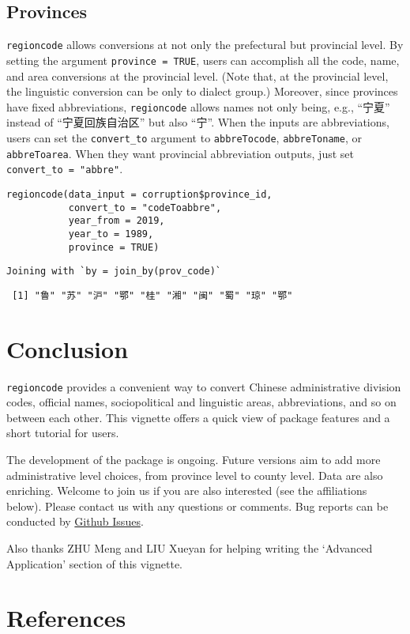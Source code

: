 \documentclass[
  article]{jss}
\begin{document}
\hypertarget{provinces}{%
\subsection{Provinces}\label{provinces}}

\texttt{regioncode} allows conversions at not only the prefectural but
provincial level. By setting the argument \texttt{province\ =\ TRUE},
users can accomplish all the code, name, and area conversions at the
provincial level. (Note that, at the provincial level, the linguistic
conversion can be only to dialect group.) Moreover, since provinces have
fixed abbreviations, \texttt{regioncode} allows names not only being,
e.g., ``宁夏'' instead of ``宁夏回族自治区'' but also ``宁''. When the
inputs are abbreviations, users can set the \texttt{convert\_to}
argument to \texttt{abbreTocode}, \texttt{abbreToname}, or
\texttt{abbreToarea}. When they want provincial abbreviation outputs,
just set \texttt{convert\_to\ =\ "abbre"}.

\begin{verbatim}
regioncode(data_input = corruption$province_id, 
           convert_to = "codeToabbre",
           year_from = 2019,
           year_to = 1989,
           province = TRUE)
\end{verbatim}

\begin{verbatim}
Joining with `by = join_by(prov_code)`
\end{verbatim}

\begin{verbatim}
 [1] "鲁" "苏" "沪" "鄂" "桂" "湘" "闽" "蜀" "琼" "鄂"
\end{verbatim}

\hypertarget{conclusion}{%
\section{Conclusion}\label{conclusion}}

\texttt{regioncode} provides a convenient way to convert Chinese
administrative division codes, official names, sociopolitical and
linguistic areas, abbreviations, and so on between each other. This
vignette offers a quick view of package features and a short tutorial
for users.

The development of the package is ongoing. Future versions aim to add
more administrative level choices, from province level to county level.
Data are also enriching. Welcome to join us if you are also interested
(see the affiliations below). Please contact us with any questions or
comments. Bug reports can be conducted by
\href{https://github.com/sammo3182/regioncode/issues}{Github Issues}.

Also thanks ZHU Meng and LIU Xueyan for helping writing the `Advanced
Application' section of this vignette.

\hypertarget{sec-references}{%
\section*{References}\label{sec-references}}
\end{document}
